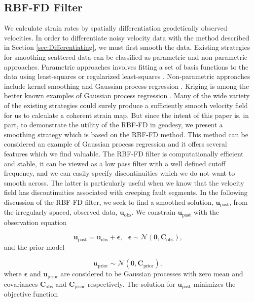 \documentclass[10pt,a4paper]{article}
\begin{document}
\subsection{RBF-FD Filter}\label{sec:Filter}
We calculate strain rates by spatially differentiation geodetically observed velocities.  In order to differentiate noisy velocity data with the method described in Section \ref{sec:Differentiating}, we must first smooth the data. Existing strategies for smoothing scattered data can be classified as parametric and non-parametric approaches.  Parametric approaches involves fitting a set of basis functions to the data using least-squares or regularized least-squares \citep[e.g.][]{Fasshauer2007}. Non-parametric approaches include kernel smoothing \citep[e.g.][]{Hastie1990} and Gaussian process regression \citep[e.g.][]{Rasmussen2006}. Kriging is among the better known examples of Gaussian process regression \citep{Matheron1963}.  Many of the wide variety of the existing strategies could surely produce a sufficiently smooth velocity field for us to calculate a coherent strain map. But since the intent of this paper is, in part, to demonstrate the utility of the RBF-FD in geodesy, we present a smoothing strategy which is based on the RBF-FD method.  This method can be considered an example of Gaussian process regression and it offers several features which we find valuable.  The RBF-FD filter is computationally efficient and stable, it can be viewed as a low pass filter with a well defined cutoff frequency, and we can easily specify discontinuities which we do not want to smooth across.  The latter is particularly useful when we know that the velocity field has discontinuities associated with creeping fault segments. In the following discussion of the RBF-FD filter, we seek to find a smoothed solution, $\mathbf{u}_\mathrm{post}$, from the irregularly spaced, observed data, $\mathbf{u}_\mathrm{obs}$. We constrain $\mathbf{u}_\mathrm{post}$ with the observation equation

\begin{equation}\label{eq:Data}
  \mathbf{u}_\mathrm{post} = \mathbf{u}_\mathrm{obs} + \mathbf{\epsilon},\ \ \ \mathbf{\epsilon} \sim \mathcal{N}(\mathbf{0},\mathbf{C}_\mathrm{obs}),
\end{equation}
and the prior model

\begin{equation}\label{eq:Prior}
  \mathbf{u}_\mathrm{prior} \sim \mathcal{N}(\mathbf{0},\mathbf{C}_\mathrm{prior}),
\end{equation}
where $\mathbf{\epsilon}$ and $\mathbf{u}_\mathrm{prior}$ are considered to be Gaussian processes with zero mean and covariances $\mathbf{C}_\mathrm{obs}$ and $\mathbf{C}_\mathrm{prior}$ respectively.  The solution for $\mathbf{u}_\mathrm{post}$ minimizes the objective function  
\end{document}

